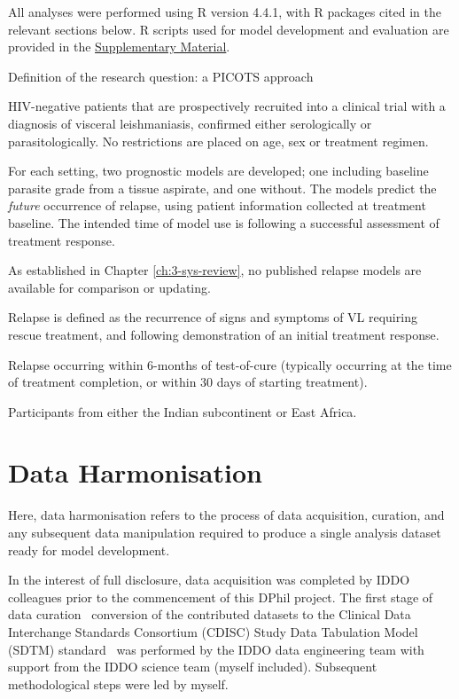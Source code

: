 All analyses were performed using R version 4.4.1\cite{r2025}, with R packages cited in the relevant sections below. R scripts used for model development and evaluation are provided in the \href{https://github.com/jpwil/dphil}{Supplementary Material}.

\begin{mybox}[label=box:picots]{Definition of the research question: a PICOTS approach}
  \begin{description}[nosep]
    \item[Population] HIV-negative patients that are prospectively recruited into a clinical trial with a diagnosis of visceral leishmaniasis, confirmed either serologically or parasitologically. No restrictions are placed on age, sex or treatment regimen.
    \item[Index models] For each setting, two prognostic models are developed; one including baseline parasite grade from a tissue aspirate, and one without. The models predict the \textit{future} occurrence of relapse, using patient information collected at treatment baseline. The intended time of model use is following a successful assessment of treatment response.
    \item[Comparator model] As established in Chapter \ref{ch:3-sys-review}, no published relapse models are available for comparison or updating.
    \item[Outcome] Relapse is defined as the recurrence of signs and symptoms of VL requiring rescue treatment, and following demonstration of an initial treatment response.
    \item[Timing] Relapse occurring within 6-months of test-of-cure (typically occurring at the time of treatment completion, or within 30 days of starting treatment).
    \item[Setting] Participants from either the Indian subcontinent or East Africa.
  \end{description}
\end{mybox}

\section{Data Harmonisation}

Here, data harmonisation refers to the process of data acquisition, curation, and any subsequent data manipulation required to produce a single analysis dataset ready for model development.

In the interest of full disclosure, data acquisition was completed by IDDO colleagues prior to the commencement of this DPhil project. The first stage of data curation \textemdash\ conversion of the contributed datasets to the Clinical Data Interchange Standards Consortium (CDISC) Study Data Tabulation Model (SDTM) standard \textemdash\ was performed by the IDDO data engineering team with support from the IDDO science team (myself included). Subsequent methodological steps were led by myself.

